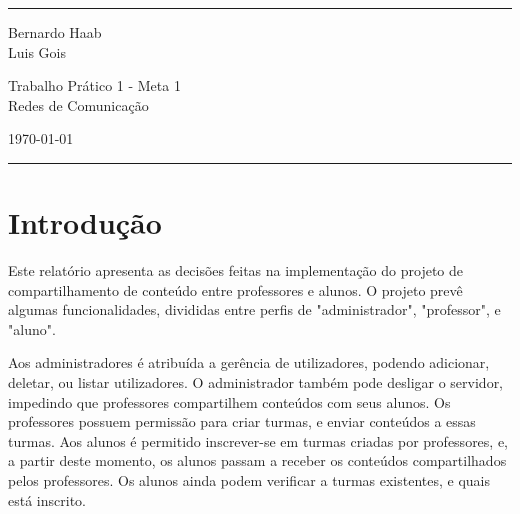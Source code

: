 \documentclass[a4paper]{article}
\begin{document}


\fancyhead[C]{}
\hrule \medskip 
\begin{minipage}{0.295\textwidth} 
\raggedright
\footnotesize
Bernardo Haab  \hfill\\
Luis Gois
\end{minipage}
\begin{minipage}{0.4\textwidth} 
\centering 
\large 
Trabalho  Prático 1 - Meta 1\\ 
\normalsize 
Redes de Comunicação\\ 
\end{minipage}
\begin{minipage}{0.295\textwidth} 
\raggedleft
\today\hfill\\
\end{minipage}
\medskip\hrule 
\bigskip

\newenvironment{itemize*}%
  {\begin{itemize}%
    \setlength{\itemsep}{0pt}%
    \setlength{\parskip}{0pt}}%
  {\end{itemize}}

\section{Introdução}

Este relatório apresenta as decisões feitas na implementação do projeto de compartilhamento de conteúdo entre professores e alunos. O projeto prevê algumas funcionalidades, divididas entre perfis de "administrador", "professor", e "aluno". 

Aos administradores é atribuída a gerência de utilizadores, podendo adicionar, deletar, ou listar utilizadores. O administrador também pode desligar o servidor, impedindo que professores compartilhem conteúdos com seus alunos. Os professores possuem permissão para criar turmas, e enviar conteúdos a essas turmas. Aos alunos é permitido inscrever-se em turmas criadas por professores, e, a partir deste momento, os alunos passam a receber os conteúdos compartilhados pelos professores. Os alunos ainda podem verificar a turmas existentes, e quais está inscrito.
\end{document}
